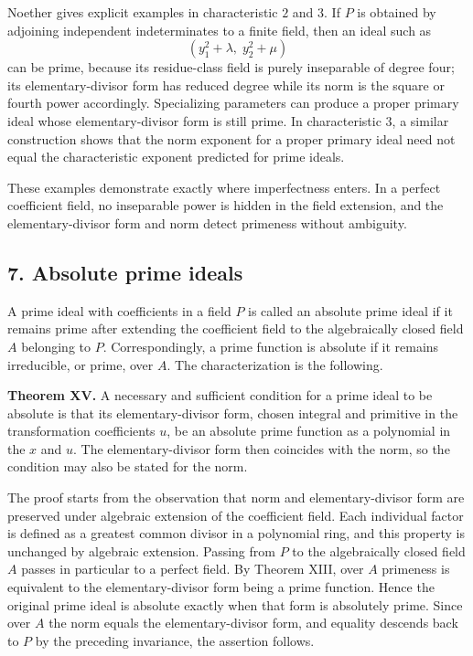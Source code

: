 \documentclass[11pt]{article}
\begin{document}
Noether gives explicit examples in characteristic $2$ and $3$. If $P$ is obtained by adjoining independent indeterminates to a finite field, then an ideal such as
\[
  (y_1^2+\lambda,\; y_2^2+\mu)
\]
can be prime, because its residue-class field is purely inseparable of degree four; its elementary-divisor form has reduced degree while its norm is the square or fourth power accordingly. Specializing parameters can produce a proper primary ideal whose elementary-divisor form is still prime. In characteristic $3$, a similar construction shows that the norm exponent for a proper primary ideal need not equal the characteristic exponent predicted for prime ideals.

These examples demonstrate exactly where imperfectness enters. In a perfect coefficient field, no inseparable power is hidden in the field extension, and the elementary-divisor form and norm detect primeness without ambiguity.

\subsection{7. Absolute prime ideals}

A prime ideal with coefficients in a field $P$ is called an absolute prime ideal if it remains prime after extending the coefficient field to the algebraically closed field $A$ belonging to $P$. Correspondingly, a prime function is absolute if it remains irreducible, or prime, over $A$. The characterization is the following.

\textbf{Theorem XV.} A necessary and sufficient condition for a prime ideal to be absolute is that its elementary-divisor form, chosen integral and primitive in the transformation coefficients $u$, be an absolute prime function as a polynomial in the $x$ and $u$. The elementary-divisor form then coincides with the norm, so the condition may also be stated for the norm.

The proof starts from the observation that norm and elementary-divisor form are preserved under algebraic extension of the coefficient field. Each individual factor is defined as a greatest common divisor in a polynomial ring, and this property is unchanged by algebraic extension. Passing from $P$ to the algebraically closed field $A$ passes in particular to a perfect field. By Theorem XIII, over $A$ primeness is equivalent to the elementary-divisor form being a prime function. Hence the original prime ideal is absolute exactly when that form is absolutely prime. Since over $A$ the norm equals the elementary-divisor form, and equality descends back to $P$ by the preceding invariance, the assertion follows.
\end{document}
